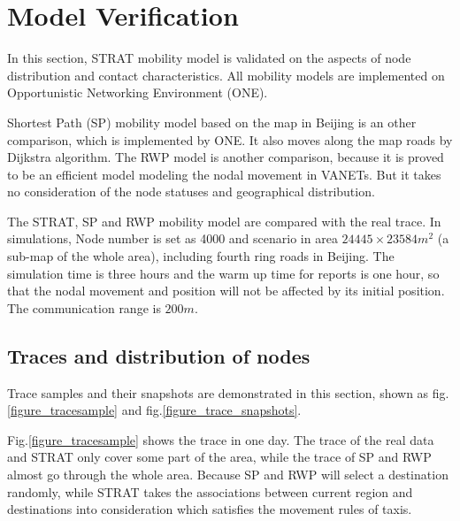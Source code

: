 \section{Model Verification}
\label{section_model_varification}
In this section, STRAT mobility model is validated on the aspects of node distribution and contact characteristics. All mobility models are implemented on Opportunistic Networking Environment (ONE)\cite{KeranenOtt-155}.

Shortest Path (SP) mobility model based on the map in Beijing is an other comparison, which is implemented by ONE.  It also moves along the map roads by Dijkstra algorithm.
The RWP model is another comparison, because it is proved to be an efficient model modeling the nodal movement in VANETs. But it takes no consideration of the node statuses and geographical distribution.

The STRAT, SP and RWP mobility model are compared with the real trace.
In simulations, Node number is set as 4000 and scenario in area $24445\times23584 m^2$ (a sub-map of the whole area), including fourth ring roads in Beijing. The simulation time is three hours and the warm up time for reports is one hour, so that the nodal movement and position will not be affected by its initial position. The communication range is $200m$.

\subsection{Traces and distribution of nodes}

Trace samples and their snapshots are demonstrated in this section, shown as fig. \ref{figure_tracesample} and fig.\ref{figure_trace_snapshots}.




Fig.\ref{figure_tracesample} shows the trace in one day. The trace of the real data and STRAT only cover some part of the area, while the trace of SP and RWP almost go through the whole area. Because SP and RWP will select a destination randomly, while STRAT takes the associations between current region and destinations into consideration which satisfies the movement rules of taxis.

